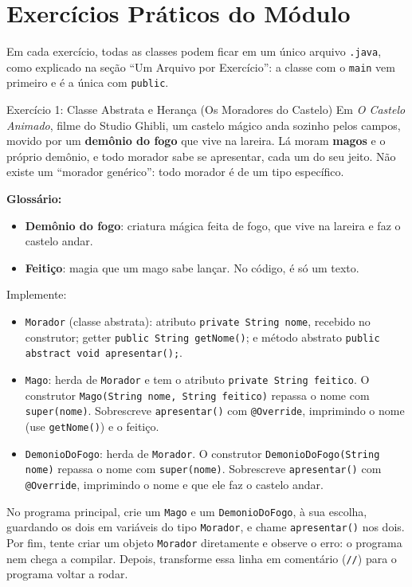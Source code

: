 \section{Exercícios Práticos do Módulo}

Em cada exercício, todas as classes podem ficar em um único arquivo \texttt{.java}, como
explicado na seção ``Um Arquivo por Exercício'': a classe com o \texttt{main} vem primeiro e é a
única com \texttt{public}.

\begin{exercicio}{Exercício 1: Classe Abstrata e Herança (Os Moradores do Castelo)}
Em \textit{O Castelo Animado}, filme do Studio Ghibli, um castelo mágico anda sozinho pelos
campos, movido por um \textbf{demônio do fogo} que vive na lareira. Lá moram \textbf{magos} e o
próprio demônio, e todo morador sabe se apresentar, cada um do seu jeito. Não existe um
``morador genérico'': todo morador é de um tipo específico.

\textbf{Glossário:}
\begin{itemize}
    \item \textbf{Demônio do fogo}: criatura mágica feita de fogo, que vive na lareira e faz o
    castelo andar.
    \item \textbf{Feitiço}: magia que um mago sabe lançar. No código, é só um texto.
\end{itemize}

Implemente:

\begin{itemize}
    \item \texttt{Morador} (classe abstrata): atributo \texttt{private String nome}, recebido no
    construtor; getter \texttt{public String getNome()}; e método abstrato
    \texttt{public abstract void apresentar();}.

    \item \texttt{Mago}: herda de \texttt{Morador} e tem o atributo
    \texttt{private String feitico}. O construtor \texttt{Mago(String nome, String feitico)}
    repassa o nome com \texttt{super(nome)}. Sobrescreve \texttt{apresentar()} com
    \texttt{@Override}, imprimindo o nome (use \texttt{getNome()}) e o feitiço.

    \item \texttt{DemonioDoFogo}: herda de \texttt{Morador}. O construtor
    \texttt{DemonioDoFogo(String nome)} repassa o nome com \texttt{super(nome)}. Sobrescreve
    \texttt{apresentar()} com \texttt{@Override}, imprimindo o nome e que ele faz o castelo
    andar.
\end{itemize}

No programa principal, crie um \texttt{Mago} e um \texttt{DemonioDoFogo}, à sua escolha,
guardando os dois em variáveis do tipo \texttt{Morador}, e chame \texttt{apresentar()} nos dois.
Por fim, tente criar um objeto \texttt{Morador} diretamente e observe o erro: o programa nem
chega a compilar. Depois, transforme essa linha em comentário (\texttt{//}) para o programa
voltar a rodar.
\end{exercicio}

